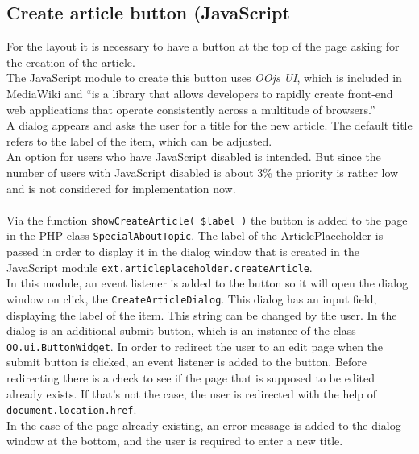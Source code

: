 \subsection{Create article button (JavaScript}
		
For the layout it is necessary to have a button at the top of the page asking for the creation of the article. \\
The JavaScript module to create this button uses \textit{OOjs UI}, which is included in MediaWiki and ``is a library that allows developers to rapidly create front-end web applications that operate consistently across a multitude of browsers.'' \citep{wiki:27} \\
A dialog appears and asks the user for a title for the new article. The default title refers to the label of the item, which can be adjusted. \\
An option for users who have JavaScript disabled is intended. But since the number of users with JavaScript disabled is about 3\% \citep{wiki:02} the priority is rather low and is not considered for implementation now. \\
\\
Via the function \texttt{\justify showCreateArticle( \$label )} the button is added to the page in the PHP class \texttt{\justify SpecialAboutTopic}. The label of the ArticlePlaceholder is passed in order to display it in the dialog window that is created in the JavaScript module \texttt{\justify ext.articleplaceholder.createArticle}. \\
In this module, an event listener is added to the button so it will open the dialog window on click, the \texttt{CreateArticleDialog}. This dialog has an input field, displaying the label of the item. This string can be changed by the user. In the dialog is an additional submit button, which is an instance of the class \texttt{OO.ui.ButtonWidget}. In order to redirect the user to an edit page when the submit button is clicked, an event listener is added to the button. Before redirecting there is a check to see if the page that is supposed to be edited already exists. If that's not the case, the user is redirected with the help of \texttt{\justify document.location.href}. \\
In the case of the page already existing, an error message is added to the dialog window at the bottom, and the user is required to enter a new title.